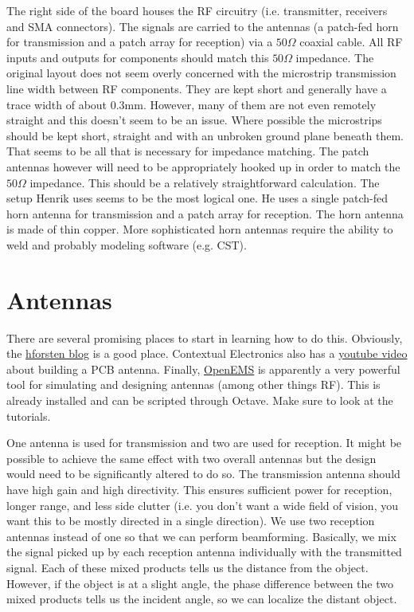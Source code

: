 \documentclass{default}
\begin{document}
The right side of the board houses the RF circuitry (i.e. transmitter, receivers and SMA
connectors). The signals are carried to the antennas (a patch-fed horn for transmission and a patch
array for reception) via a $50\si{\Omega}$ coaxial cable. All RF inputs and outputs for components
should match this $50\si{\Omega}$ impedance. The original layout does not seem overly concerned with
the microstrip transmission line width between RF components. They are kept short and generally have
a trace width of about 0.3mm. However, many of them are not even remotely straight and this doesn't
seem to be an issue. Where possible the microstrips should be kept short, straight and with an
unbroken ground plane beneath them. That seems to be all that is necessary for impedance
matching. The patch antennas however will need to be appropriately hooked up in order to match the
$50\si{\Omega}$ impedance. This should be a relatively straightforward calculation. The setup Henrik
uses seems to be the most logical one. He uses a single patch-fed horn antenna for transmission and
a patch array for reception. The horn antenna is made of thin copper. More sophisticated horn
antennas require the ability to weld and probably modeling software (e.g. CST).

\chapter{Antennas}
\label{cha:antennas}

There are several promising places to start in learning how to do this. Obviously, the
\href{hforsten.com}{hforsten blog} is a good place. Contextual Electronics also has a
\href{https://www.youtube.com/watch?v=m0B-63Q-R_8}{youtube video} about building a PCB
antenna. Finally, \href{http://openems.de/index.php/Main_Page.html}{OpenEMS} is apparently a very
powerful tool for simulating and designing antennas (among other things RF). This is already
installed and can be scripted through Octave. Make sure to look at the tutorials.

One antenna is used for transmission and two are used for reception. It might be possible to achieve
the same effect with two overall antennas but the design would need to be significantly altered to
do so. The transmission antenna should have high gain and high directivity. This ensures sufficient
power for reception, longer range, and less side clutter (i.e. you don't want a wide field of
vision, you want this to be mostly directed in a single direction). We use two reception antennas
instead of one so that we can perform beamforming. Basically, we mix the signal picked up by each
reception antenna individually with the transmitted signal. Each of these mixed products tells us
the distance from the object. However, if the object is at a slight angle, the phase difference
between the two mixed products tells us the incident angle, so we can localize the distant object.
\end{document}
